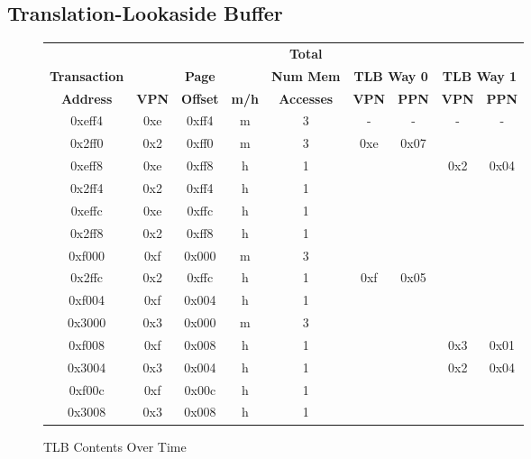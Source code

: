 \documentclass[10pt]{article}
\begin{document}
\subsection{Translation-Lookaside Buffer}
\begin{figure}[H]
\centering
{
\begin{tabular}{@{\extracolsep{3pt}}ccccccccc@{}}
\hline
& & & & \textbf{Total} & & & & \\
\textbf{Transaction} & & \textbf{Page} & & \textbf{Num Mem} & \multicolumn{2}{c}{\textbf{TLB Way 0}} & \multicolumn{2}{c}{\textbf{TLB Way 1}} \\
\cline{6-7}
\cline{8-9}
\textbf{Address} & \textbf{VPN} & \textbf{Offset} & \textbf{m/h} & \textbf{Accesses} & \textbf{VPN} & \textbf{PPN} & \textbf{VPN} & \textbf{PPN} \\
\hline
0xeff4 & 0xe & 0xff4 & m & 3 & - & - & - & - \\
\hline
0x2ff0 & 0x2 & 0xff0 & m & 3 & 0xe & 0x07 & & \\
\hline
0xeff8 & 0xe & 0xff8 & h & 1 &  &  & 0x2 & 0x04 \\
\hline
0x2ff4 & 0x2 & 0xff4 & h & 1 & & & & \\
\hline
0xeffc & 0xe & 0xffc & h & 1 & & & & \\
\hline
0x2ff8 & 0x2 & 0xff8 & h & 1 & & & & \\
\hline
0xf000 & 0xf & 0x000 & m & 3 & & & & \\
\hline
0x2ffc & 0x2 & 0xffc & h & 1 & 0xf & 0x05 & & \\
\hline
0xf004 & 0xf & 0x004 & h & 1 & & & & \\
\hline
0x3000 & 0x3 & 0x000 & m & 3 & & & & \\
\hline
0xf008 & 0xf & 0x008 & h & 1 & & & 0x3 & 0x01 \\
\hline
0x3004 & 0x3 & 0x004 & h & 1 & & & 0x2 & 0x04 \\
\hline
0xf00c & 0xf & 0x00c & h & 1 & & & & \\
\hline
0x3008 & 0x3 & 0x008 & h & 1 & & & & \\
\hline
\end{tabular}
}
\caption{TLB Contents Over Time}
\end{figure}

\cleardoublepage
\end{document}
